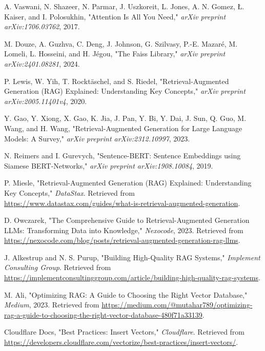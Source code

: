 \documentclass{wseas}
\begin{document}
\begin{thebibliography}{9}

   A. Vaswani, N. Shazeer, N. Parmar, J. Uszkoreit, L. Jones, A. N. Gomez, Ł. Kaiser, and I. Polosukhin, "Attention Is All You Need," \textit{arXiv preprint arXiv:1706.03762}, 2017.
  
   M. Douze, A. Guzhva, C. Deng, J. Johnson, G. Szilvasy, P.-E. Mazaré, M. Lomeli, L. Hosseini, and H. Jégou, "The Faiss Library," \textit{arXiv preprint arXiv:2401.08281}, 2024.
  
   P. Lewis, W. Yih, T. Rocktäschel, and S. Riedel, "Retrieval-Augmented Generation (RAG) Explained: Understanding Key Concepts," \textit{arXiv preprint arXiv:2005.11401v4}, 2020.
  
   Y. Gao, Y. Xiong, X. Gao, K. Jia, J. Pan, Y. Bi, Y. Dai, J. Sun, Q. Guo, M. Wang, and H. Wang, "Retrieval-Augmented Generation for Large Language Models: A Survey," \textit{arXiv preprint arXiv:2312.10997}, 2023.
  
   N. Reimers and I. Gurevych, "Sentence-BERT: Sentence Embeddings using Siamese BERT-Networks," \textit{arXiv preprint arXiv:1908.10084}, 2019.
  
   P. Miesle, "Retrieval-Augmented Generation (RAG) Explained: Understanding Key Concepts," \textit{DataStax}. Retrieved from \url{https://www.datastax.com/guides/what-is-retrieval-augmented-generation}.
  
   D. Owczarek, "The Comprehensive Guide to Retrieval-Augmented Generation LLMs: Transforming Data into Knowledge," \textit{Nexocode}, 2023. Retrieved from \url{https://nexocode.com/blog/posts/retrieval-augmented-generation-rag-llms}.
  
   J. Alkestrup and N. S. Purup, "Building High-Quality RAG Systems," \textit{Implement Consulting Group}. Retrieved from \url{https://implementconsultinggroup.com/article/building-high-quality-rag-systems}.
  
   M. Ali, "Optimizing RAG: A Guide to Choosing the Right Vector Database," \textit{Medium}, 2023. Retrieved from \url{https://medium.com/@mutahar789/optimizing-rag-a-guide-to-choosing-the-right-vector-database-480f71a33139}.
  
   Cloudflare Docs, "Best Practices: Insert Vectors," \textit{Cloudflare}. Retrieved from \url{https://developers.cloudflare.com/vectorize/best-practices/insert-vectors/}.
  

\end{thebibliography}
\end{document}
